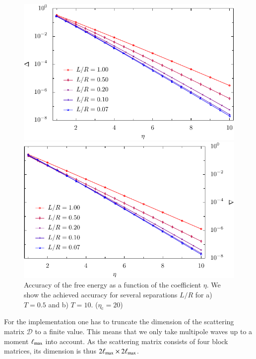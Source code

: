 \begin{figure}
    \begin{minipage}[b]{.5\linewidth}
    \centering
    \includegraphics[scale=0.66]{plots/numeric/convergence_lmax/convergence_0_50.pdf}
    \end{minipage}%
    \begin{minipage}[b]{.5\linewidth}
    \centering
    \includegraphics[scale=0.66]{plots/numeric/convergence_lmax/convergence_10_00.pdf}
    \end{minipage}

  \caption{Accuracy of the free energy as a function of the coefficient $\eta$. We show the achieved
  accuracy for several separations $L/R$ for a) $T=0.5$ and b) $T=10$. ($\eta_\text{c}=20$)}
  \label{fig:convergence_lmax}
\end{figure}

For the implementation one has to truncate the dimension of the scattering
matrix $\mathcal{D}$ to a finite value. This means that we only take
multipole waves up to a moment ${\ell_\text{max}}$ into account. As the scattering
matrix consists of four block matrices, its dimension is thus
$2{\ell_\text{max}}\times2{\ell_\text{max}}$.

